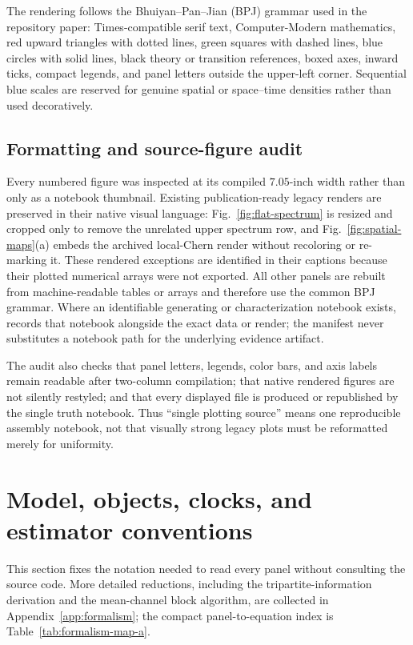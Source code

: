 \documentclass[aps,prb,twocolumn,floatfix,nofootinbib,superscriptaddress]{revtex4-2}
\newcommand{\subfolder}[1]{\path{#1}}
\begin{document}
The rendering follows the Bhuiyan--Pan--Jian (BPJ) grammar used in the repository paper:
Times-compatible serif text, Computer-Modern mathematics, red upward triangles with
dotted lines, green squares with dashed lines, blue circles with solid lines, black
theory or transition references, boxed axes, inward ticks, compact legends, and panel
letters outside the upper-left corner.  Sequential blue scales are reserved for genuine
spatial or space--time densities rather than used decoratively.

\subsection{Formatting and source-figure audit}

Every numbered figure was inspected at its compiled $7.05$-inch width rather than only as
a notebook thumbnail.  Existing publication-ready legacy renders are preserved in their
native visual language: Fig.~\ref{fig:flat-spectrum} is resized and cropped only to remove
the unrelated upper spectrum row, and Fig.~\ref{fig:spatial-maps}(a) embeds the archived
local-Chern render without recoloring or re-marking it.  These rendered exceptions are
identified in their captions because their plotted numerical arrays were not exported.
All other panels are rebuilt from machine-readable tables or arrays and therefore use the
common BPJ grammar.  Where an identifiable generating or characterization notebook exists,
\subfolder{figure_manifest.json} records that notebook alongside the exact data or render;
the manifest never substitutes a notebook path for the underlying evidence artifact.

The audit also checks that panel letters, legends, color bars, and axis labels remain
readable after two-column compilation; that native rendered figures are not silently
restyled; and that every displayed file is produced or republished by the single truth
notebook.  Thus ``single plotting source'' means one reproducible assembly notebook, not
that visually strong legacy plots must be reformatted merely for uniformity.

\section{Model, objects, clocks, and estimator conventions}
\label{sec:model-conventions}

This section fixes the notation needed to read every panel without consulting the source
code.  More detailed reductions, including the tripartite-information derivation and the
mean-channel block algorithm, are collected in Appendix~\ref{app:formalism}; the compact
panel-to-equation index is Table~\ref{tab:formalism-map-a}.
\end{document}
